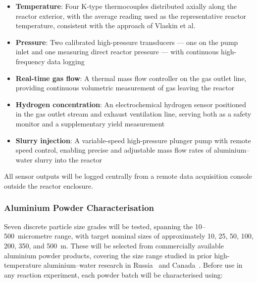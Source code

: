 \documentclass[12pt]{article}
\begin{document}
\begin{itemize}
    \item \textbf{Temperature}: Four K-type thermocouples distributed axially along 
    the reactor exterior, with the average reading used as the representative reactor 
    temperature, consistent with the approach of Vlaskin et al.~\cite{high-temp-Al-H2O}

    \item \textbf{Pressure}: Two calibrated high-pressure transducers --- one on the 
    pump inlet and one measuring direct reactor pressure --- with continuous 
    high-frequency data logging

    \item \textbf{Real-time gas flow}: A thermal mass flow controller on the gas 
    outlet line, providing continuous volumetric measurement of gas leaving the 
    reactor

    \item \textbf{Hydrogen concentration}: An electrochemical hydrogen sensor 
    positioned in the gas outlet stream and exhaust ventilation line, serving both 
    as a safety monitor and a supplementary yield measurement

    \item \textbf{Slurry injection}: A variable-speed high-pressure plunger pump 
    with remote speed control, enabling precise and adjustable mass flow rates of 
    aluminium--water slurry into the reactor
\end{itemize}

All sensor outputs will be logged centrally from a remote data acquisition console 
outside the reactor enclosure.

\subsubsection*{Aluminium Powder Characterisation}

Seven discrete particle size grades will be tested, spanning the 10--500~micrometre 
range, with target nominal sizes of approximately 10, 25, 50, 100, 200, 350, and 
500~\textmu m. These will be selected from commercially available aluminium powder 
products, covering the size range studied in prior high-temperature aluminium--water 
research in Russia~\cite{high-temp-Al-H2O} and Canada~\cite{high-temp-metal-water-reactor-exp-Canada}. Before use in 
any reaction experiment, each powder batch will be characterised using:
\end{document}
